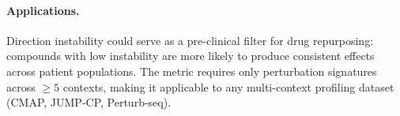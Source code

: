 \documentclass[11pt]{article}
\begin{document}
\paragraph{Applications.}
Direction instability could serve as a pre-clinical filter for drug
repurposing: compounds with low instability are more likely to produce
consistent effects across patient populations. The metric requires only
perturbation signatures across $\geq5$ contexts, making it applicable to
any multi-context profiling dataset (CMAP, JUMP-CP, Perturb-seq).



\end{document}
